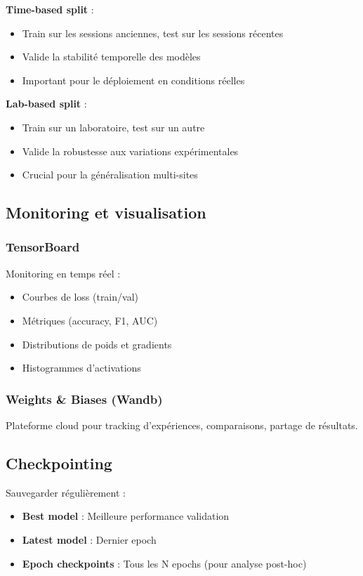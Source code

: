 \textbf{Time-based split} :
\begin{itemize}
    \item Train sur les sessions anciennes, test sur les sessions récentes
    \item Valide la stabilité temporelle des modèles
    \item Important pour le déploiement en conditions réelles
\end{itemize}

\textbf{Lab-based split} :
\begin{itemize}
    \item Train sur un laboratoire, test sur un autre
    \item Valide la robustesse aux variations expérimentales
    \item Crucial pour la généralisation multi-sites
\end{itemize}

\subsection{Monitoring et visualisation}

\subsubsection{TensorBoard}

Monitoring en temps réel :
\begin{itemize}
    \item Courbes de loss (train/val)
    \item Métriques (accuracy, F1, AUC)
    \item Distributions de poids et gradients
    \item Histogrammes d'activations
\end{itemize}

\subsubsection{Weights \& Biases (Wandb)}

Plateforme cloud pour tracking d'expériences, comparaisons, partage de résultats.

\subsection{Checkpointing}

Sauvegarder régulièrement :
\begin{itemize}
    \item \textbf{Best model} : Meilleure performance validation
    \item \textbf{Latest model} : Dernier epoch
    \item \textbf{Epoch checkpoints} : Tous les N epochs (pour analyse post-hoc)
\end{itemize}

